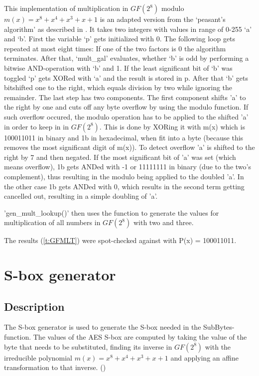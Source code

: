 This implementation of multiplication in $GF(2^{8})$ modulo $m(x) = x^8 + x^4 +
x^3 + x + 1$ is an adapted version from the `peasant's algorithm' as
described in
\cite{peasants}.
It takes two integers with values in range of 0-255 `a' and `b'. First
the variable `p' gets initialized with 0. The following loop gets
repeated at most eight times: If one of the two factors is 0 the
algorithm terminates. After that, `mult\_gal' evaluates, whether `b' is
odd by performing a bitwise AND-operation with `b' and 1. If the least
significant bit of `b' was toggled `p' gets XORed with `a' and the
result is stored in p. After that `b' gets bitshifted one to the right,
which equals division by two while ignoring the remainder. The last step
has two components.
The first component shifts 'a' to the right by one and cuts off any byte overflow
by using the modulo function. If such overflow occured, the modulo operation has to be
applied to the shifted 'a' in order to keep in in $GF(2^{8})$. This is done by XORing it
with m(x) which is 100011011 in binary and 1b in hexadecimal, when fit into a byte (because
this removes the most significant digit of m(x)). To detect overflow 'a' is shifted to the right by 7
and then negated. If the most significant bit of 'a' was set (which means overflow), 1b gets ANDed
with -1 or 11111111 in binary (due to the two's complement), thus resulting in the modulo being applied to the doubled 'a'. In the other case 1b gets ANDed with 0, which results in the second term getting cancelled out, resulting in a simple doubling of 'a'.

'gen\_mult\_lookup()' then uses the function to generate the values for
multiplication of all numbers in $GF(2^{8})$ with two and three.

The results (\ref{t:GFMLT}) were spot-checked against
\cite{galcalc} with P(x) = 100011011.

\hypertarget{s-box-generator}{%
\section{S-box generator}\label{s-box-generator}}

\hypertarget{description-1}{%
\subsection{Description}\label{description-1}}

The S-box generator is used to generate the S-box needed in the
SubBytes-function.
The values of the AES S-box are computed by taking the value of the byte
that needs to be substituted, finding its inverse in $GF(2^{8})$ with the
irreducible polynomial $m(x) = x^8 + x^4 + x^3 + x + 1$ and applying an
affine transformation to that inverse. (\cite[ch 3.4.1]{rijndael})

